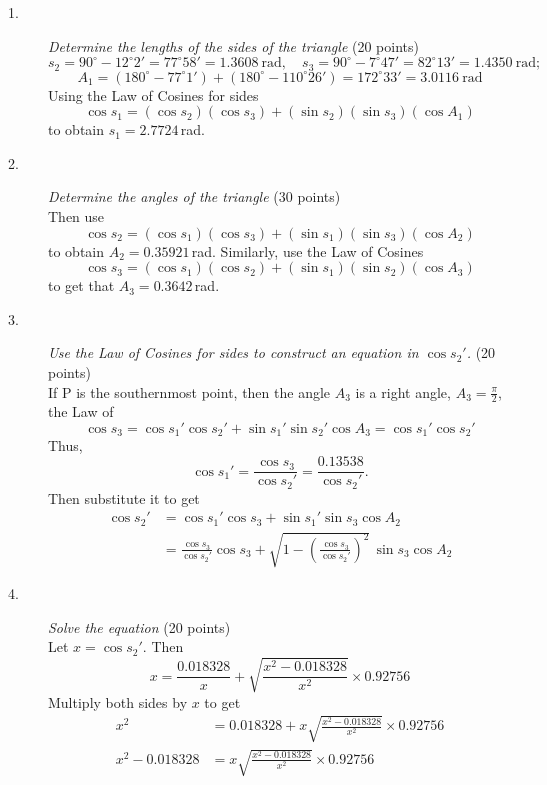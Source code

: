 \begin{description}
\item[1.] \emph{Determine the lengths of the sides of the triangle}
  \hfill(20 points)\\
  \[ s_2 = 90^\circ - 12^\circ 2' = 77^\circ 58' = 1.3608\ \mathrm{rad},\quad
     s_3 = 90^\circ - 7^\circ 47' = 82^\circ 13' = 1.4350\ \mathrm{rad}; \]
  \[ A_1 = (180^\circ - 77^\circ 1') + (180^\circ - 110^\circ 26')
     = 172^\circ 33' = 3.0116\ \mathrm{rad} \]
  Using the Law of Cosines for sides
  \[ \cos s_1 = (\cos s_2)(\cos s_3) + (\sin s_2)(\sin s_3)(\cos A_1) \]
  to obtain $s_1 = 2.7724$\,rad.
\item[2.] \emph{Determine the angles of the triangle} \hfill(30 points)\\
  Then use
  \[ \cos s_2 = (\cos s_1)(\cos s_3) + (\sin s_1)(\sin s_3)(\cos A_2) \]
  to obtain $A_2 = 0.35921$\,rad. Similarly, use the Law of Cosines
  \[ \cos s_3 = (\cos s_1)(\cos s_2) + (\sin s_1)(\sin s_2)(\cos A_3) \]
  to get that $A_3 = 0.3642$\,rad.
\item[3.] \emph{Use the Law of Cosines for sides to construct an equation in
  $\cos s_2'$.} \hfill(20 points)\\
  If P is the southernmost point, then the angle $A_3$ is a right angle,
  $A_3 = \frac{\pi}{2}$, the Law of
  \[ \cos s_3 = \cos s_1' \cos s_2' + \sin s_1' \sin s_2' \cos A_3
     = \cos s_1' \cos s_2' \]
  Thus,
  \[ \cos s_1' = \frac{\cos s_3}{\cos s_2'}
     = \frac{0.13538}{\cos s_2'}. \]
  Then substitute it to get
  \begin{align*}
  \cos s_2' &= \cos s_1' \cos s_3 + \sin s_1' \sin s_3 \cos A_2\\
    &= \frac{\cos s_3}{\cos s_2'}\cos s_3
     + \sqrt{1 - \left(\frac{\cos s_3}{\cos s_2'}\right)^{2}}\,
       \sin s_3 \cos A_2
  \end{align*}
\item[4.] \emph{Solve the equation} \hfill(20 points)\\
  Let $x = \cos s_2'$. Then
  \[ x = \frac{0.018328}{x}
     + \sqrt{\frac{x^2 - 0.018328}{x^2}} \times 0.92756 \]
  Multiply both sides by $x$ to get
  \begin{align*}
  x^2 &= 0.018328
     + x\sqrt{\frac{x^2 - 0.018328}{x^2}} \times 0.92756\\
  x^2 - 0.018328 &= x\sqrt{\frac{x^2 - 0.018328}{x^2}} \times 0.92756\\

\end{align*}
\end{description}
